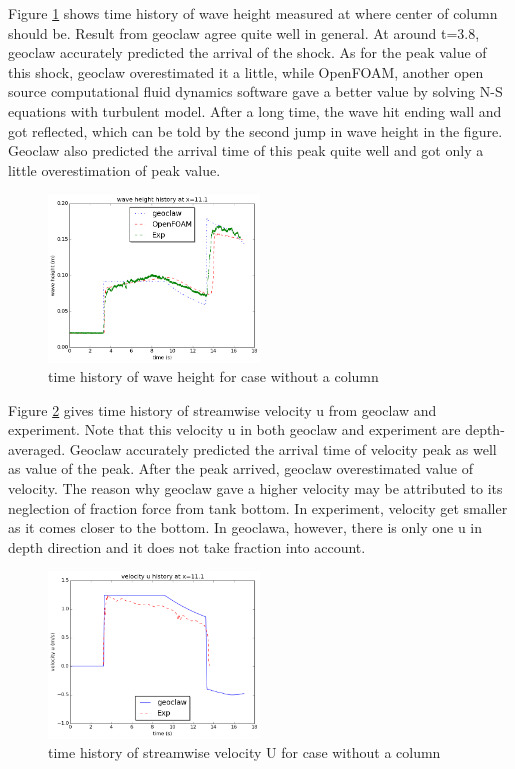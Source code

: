 \documentclass[11pt]{article}
\begin{document}
Figure \ref{fig:waveheight_nocolumn} shows time history of wave height measured at where center of column should be. 
Result from geoclaw agree quite well in general. At around t=3.8, geoclaw accurately predicted the arrival of the shock. 
As for the peak value of this shock, geoclaw overestimated it a little, while OpenFOAM, another open source computational fluid dynamics software gave a better value by solving N-S equations with turbulent model.
After a long time, the wave hit ending wall and got reflected, which can be told by the second jump in wave height in the figure. 
Geoclaw also predicted the arrival time of this peak quite well and got only a little overestimation of peak value.
\begin{figure}[h!]
    \centering
    \includegraphics[width=0.5\textwidth]{../../dambreak/myplot/waveheight_nocolumn}
    \caption{time history of wave height for case without a column}
    \label{fig:waveheight_nocolumn}
\end{figure}

Figure \ref{fig:velocityU_nocolumn} gives time history of streamwise velocity u from geoclaw and experiment. 
Note that this velocity u in both geoclaw and experiment are depth-averaged. 
Geoclaw accurately predicted the arrival time of velocity peak as well as value of the peak. 
After the peak arrived, geoclaw overestimated value of velocity.
The reason why geoclaw gave a higher velocity may be attributed to its neglection of fraction force from tank bottom. In experiment, velocity get smaller as it comes closer to the bottom. 
In geoclawa, however, there is only one u in depth direction and it does not take fraction into account. 
\begin{figure}[h!]
    \centering
    \includegraphics[width=0.5\textwidth]{../../dambreak/myplot/velocityU_nocolumn}
    \caption{time history of streamwise velocity U for case without a column}
    \label{fig:velocityU_nocolumn}
\end{figure}
\end{document}
